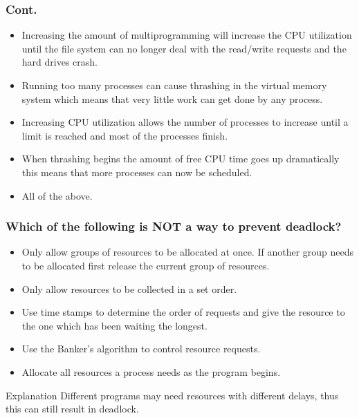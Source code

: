 \documentclass{beamer}
\begin{document}
\begin{frame}
  \frametitle{Cont.}
  \begin{itemize}
    \item Increasing the amount of multiprogramming will increase the CPU utilization until the file system can no longer deal with the read/write requests and the hard drives crash.
    \item<alert@2> Running too many processes can cause thrashing in the virtual memory system which means that very little work can get done by any process.
    \item Increasing CPU utilization allows the number of processes to increase until a limit is reached and most of the processes finish.
    \item When thrashing begins the amount of free CPU time goes up dramatically this means that more processes can now be scheduled.
    \item All of the above.
  \end{itemize}
\end{frame}
\begin{frame}
  \frametitle{Which of the following is NOT a way to prevent deadlock?}
  \begin{itemize}
    \item Only allow groups of resources to be allocated at once. If another group needs to be allocated first release the current group of resources.
    \item Only allow resources to be collected in a set order.
    \item<alert@2> Use time stamps to determine the order of requests and give the resource to the one which has been waiting the longest.
    \item Use the Banker’s algorithm to control resource requests.
    \item Allocate all resources a process needs as the program begins.
  \end{itemize}
  \pause
  \begin{block}{Explanation}
    Different programs may need resources with different delays, thus this can still result in deadlock.
  \end{block}
\end{frame}
\end{document}
